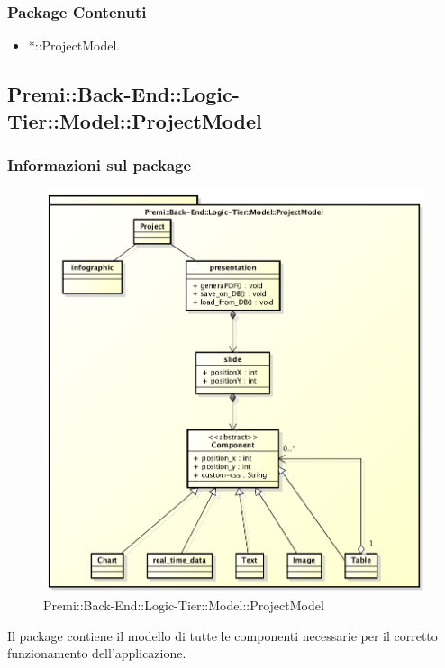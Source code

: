 	\subsubsection{Package Contenuti}
	\begin{itemize}
		\item *::ProjectModel.
	\end{itemize}

\newpage	
\subsection{Premi::Back-End::Logic-Tier::Model::ProjectModel}
	\subsubsection{Informazioni sul package}
		\begin{figure}[h]
		\centering
		\includegraphics[width=0.9\linewidth]{img/back-end-logic-tier-model-projectModel}
		\caption[Premi::Back-End::Logic-Tier::Model::ProjectModel]{Premi::Back-End::Logic-Tier::Model::ProjectModel}
		\end{figure}
	Il package contiene il modello di tutte le componenti necessarie per il corretto funzionamento dell'applicazione.



